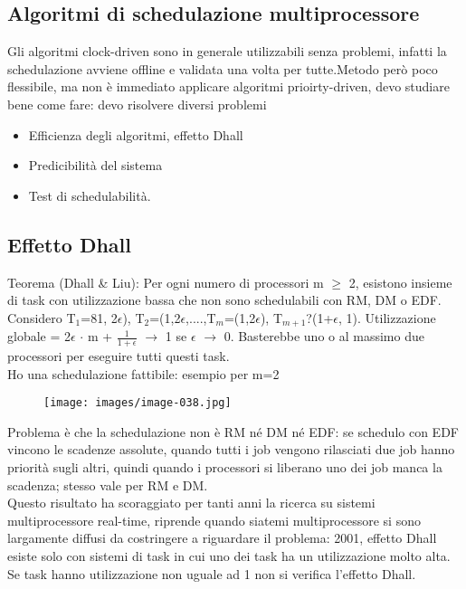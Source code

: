 \documentclass[12pt, oneside]{extbook}
\begin{document}
\subsection{Algoritmi di schedulazione multiprocessore}
Gli algoritmi clock-driven sono in generale utilizzabili senza problemi, infatti la schedulazione avviene offline e validata una volta per tutte.Metodo però poco flessibile, ma non è immediato applicare algoritmi prioirty-driven, devo studiare bene come fare: devo risolvere diversi problemi
\begin{itemize}
\item Efficienza degli algoritmi, effetto Dhall
\item Predicibilità del sistema
\item Test di schedulabilità.
\end{itemize}
\subsection{Effetto Dhall}
Teorema (Dhall \& Liu): Per ogni numero di processori m $\geq$ 2, esistono insieme di task con utilizzazione bassa che non sono schedulabili con RM, DM o EDF.\\ Considero T$_{1}$=81, 2$\epsilon$), T$_{2}$=(1,2$\epsilon$,....,T$_{m}$=(1,2$\epsilon$), T$_{m+1}$?(1+$\epsilon$, 1). Utilizzazione globale = 2$\epsilon$ $\cdot$ m + $\frac{1}{1+ \epsilon}$ $\rightarrow$ 1 se $\epsilon$ $\rightarrow$ 0. Basterebbe uno o al massimo due processori per eseguire tutti questi task.\\ Ho una schedulazione fattibile: esempio per m=2\\
\begin{figure}[!h]
\centering
\texttt{[image: images/image-038.jpg]}
\end{figure}
Problema è che la schedulazione non è RM né DM né EDF: se schedulo con EDF vincono le scadenze assolute, quando tutti i job vengono rilasciati due job hanno priorità sugli altri, quindi quando i processori si liberano uno dei job manca la scadenza; stesso vale per RM e DM.\\ Questo risultato ha scoraggiato per tanti anni la ricerca su sistemi multiprocessore real-time, riprende quando siatemi multiprocessore si sono largamente diffusi da costringere a riguardare il problema: 2001, effetto Dhall esiste solo con sistemi di task in cui uno dei task ha un utilizzazione molto alta. Se task hanno utilizzazione non uguale ad 1 non si verifica l'effetto Dhall.
\end{document}
